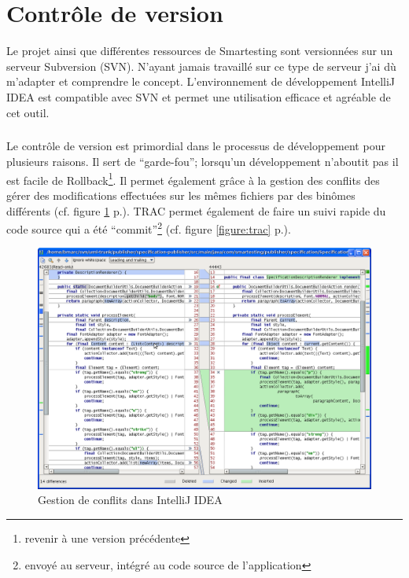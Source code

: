 \section{Contrôle de version}
Le projet ainsi que différentes ressources de Smartesting sont versionnées sur un serveur Subversion (SVN). N'ayant jamais travaillé sur ce type de serveur j'ai dù m'adapter et comprendre le concept. L'environnement de développement IntelliJ IDEA est compatible avec SVN et permet une utilisation efficace et agréable de cet outil.
\subparagraph*{}
Le contrôle de version est primordial dans le processus de développement pour plusieurs raisons. Il sert de ``garde-fou''; lorsqu'un développement n'aboutit pas il est facile de Rollback\footnote{revenir à une version précédente}. Il permet également grâce à la gestion des conflits des gérer des modifications effectuées sur les mêmes fichiers par des binômes différents (cf. figure \ref{figure:ideaMerge} p.\pageref{figure:ideaMerge}). TRAC permet également de faire un suivi rapide du code source qui a été ``commit''\footnote{envoyé au serveur, intégré au code source de l'application} (cf. figure \ref{figure:trac} p.\pageref{figure:trac}).
\begin{figure}[!ht]
\centering
\includegraphics[width=\textwidth]{Illustrations/ideaMerge.png}
\caption{Gestion de conflits dans IntelliJ IDEA}
\label{figure:ideaMerge}
\end{figure}
